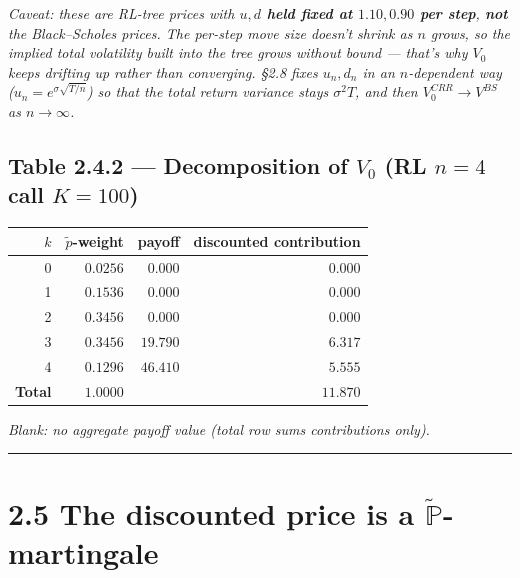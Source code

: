 \documentclass[
  10pt,
  twoside]{book}
\newcounter{none} %
\begin{document}
\emph{Caveat: these are RL-tree prices with \textbf{\(u,d\) held fixed
at \(1.10,0.90\) per step}, \textbf{not} the Black--Scholes prices. The
per-step move size doesn't shrink as \(n\) grows, so the implied total
volatility built into the tree grows without bound --- that's why
\(V_0\) keeps drifting up rather than converging. §2.8 fixes \(u_n,d_n\)
in an \(n\)-dependent way (\(u_n=e^{\sigma\sqrt{T/n}}\)) so that the
total return variance stays \(\sigma^2 T\), and then
\(V_0^{CRR}\to V^{BS}\) as \(n\to\infty\).}

\subsection{\texorpdfstring{Table 2.4.2 --- Decomposition of \(V_0\) (RL
\(n=4\) call
\(K=100\))}{Table 2.4.2 --- Decomposition of V\_0 (RL n=4 call K=100)}}\label{table-2.4.2-decomposition-of-v_0-rl-n4-call-k100}

{\def\LTcaptype{none} %
\begin{table}[H]
\centering
\begin{tabular}{|r|r|r|r|}
\toprule
\(k\) & \(\tilde p\)-weight & payoff & discounted contribution \\
\midrule



0 & \(0.0256\) & \(\phantom{0}0.000\) & \(\phantom{0}0.000\) \\
1 & \(0.1536\) & \(\phantom{0}0.000\) & \(\phantom{0}0.000\) \\
2 & \(0.3456\) & \(\phantom{0}0.000\) & \(\phantom{0}0.000\) \\
3 & \(0.3456\) & \(19.790\) & \(\phantom{0}6.317\) \\
4 & \(0.1296\) & \(46.410\) & \(\phantom{0}5.555\) \\
\textbf{Total} & \(1.0000\) & & \(\mathbf{11.870}\) \\
\bottomrule
\end{tabular}
\end{table}
}

\emph{Blank: no aggregate payoff value (total row sums contributions
only).}

\begin{center}\rule{0.5\linewidth}{0.5pt}\end{center}

\section{\texorpdfstring{2.5 The discounted price is a
\(\tilde{\mathbb P}\)-martingale}{2.5 The discounted price is a \textbackslash tilde\{\textbackslash mathbb P\}-martingale}}\label{the-discounted-price-is-a-tildemathbb-p-martingale}
\end{document}
